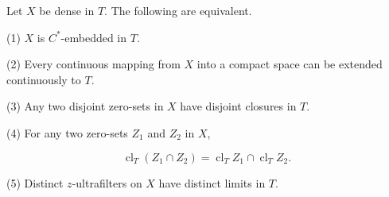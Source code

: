 Let $X$ be dense in $T$. The following are equivalent.

(1) $X$ is $C^*$-embedded in $T$.

(2) Every continuous mapping from $X$ into a compact space can be extended continuously to $T$.

(3) Any two disjoint zero-sets in $X$ have disjoint closures in $T$.

(4) For any two zero-sets $Z_1$ and $Z_2$ in $X$,

$$\operatorname{cl}_T(Z_1 \cap Z_2) = \operatorname{cl}_T Z_1 \cap \operatorname{cl}_T Z_2.$$

(5) Distinct $z$-ultrafilters on $X$ have distinct limits in $T$.
